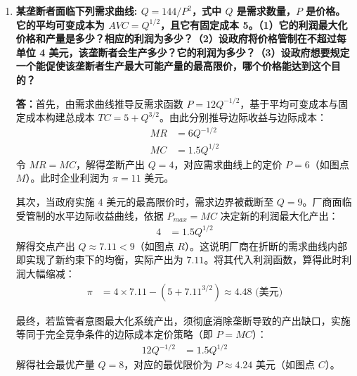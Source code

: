 \begin{enumerate}[label=\textbf{\arabic*.}, leftmargin=*]
		\textbf{答：}这种说法是错误的。垄断定价不仅涉及财富转移，更会导致资源配置的扭曲。当公司制定垄断价格时，必须通过限制产出（即供电量）来维持高价。
		
		对于镇民而言，虽然他们支付的高昂电费最终以利润形式全额返还，实现了资金的内部循环而没有流失，但为了应对高电价，他们被迫减少了原本需要的电力消费。这部分未被生产和消费的电力，其对居民的边际价值实际上高于公司的边际发电成本，这就产生了无谓损失。无谓损失代表了社会总福利的绝对减少，这种由物理产量不足导致的效率折损，是无法通过事后的金钱重新分配来弥补的。
		
		\item \textbf{某垄断者面临下列需求曲线: $Q = 144 / P^2$，式中 $Q$ 是需求数量，$P$ 是价格。它的平均可变成本为 $AVC = Q^{1/2}$，且它有固定成本 5。（1）它的利润最大化价格和产量是多少？相应的利润为多少？（2）设政府将价格管制在不超过每单位 4 美元，该垄断者会生产多少？它的利润为多少？（3）设政府想要规定一个能促使该垄断者生产最大可能产量的最高限价，哪个价格能达到这个目的？}
		
		\textbf{答：}首先，由需求曲线推导反需求函数 $P = 12Q^{-1/2}$，基于平均可变成本与固定成本构建总成本 $TC = 5 + Q^{3/2}$。由此分别推导边际收益与边际成本：
		\[
		\begin{aligned}
			MR &= 6Q^{-1/2} \\
			MC &= 1.5Q^{1/2}
		\end{aligned}
		\]
		令 $MR = MC$，解得垄断产出 $Q = 4$，对应需求曲线上的定价 $P = 6$（如图点 $M$）。此时企业利润为 $\pi = 11$ 美元。
		
		其次，当政府实施 $4$ 美元的最高限价时，需求边界被截断至 $Q = 9$。厂商面临受管制的水平边际收益曲线，依据 $P_{max} = MC$ 决定新的利润最大化产出：
		\[
		\begin{aligned}
			4 &= 1.5Q^{1/2}
		\end{aligned}
		\]
		解得交点产出 $Q \approx 7.11 < 9$（如图点 $R$）。这说明厂商在折断的需求曲线内部即实现了新约束下的均衡，实际产出为 $7.11$。将其代入利润函数，算得此时利润大幅缩减：
		\[
		\begin{aligned}
			\pi &= 4 \times 7.11 - \left( 5 + 7.11^{3/2} \right) \approx 4.48 \text{ (美元)}
		\end{aligned}
		\]
		
		最终，若监管者意图最大化系统产出，须彻底消除垄断导致的产出缺口，实施等同于完全竞争条件的边际成本定价策略（即 $P = MC$）：
		\[
		\begin{aligned}
			12Q^{-1/2} &= 1.5Q^{1/2}
		\end{aligned}
		\]
		解得社会最优产量 $Q = 8$，对应的最优限价为 $P \approx 4.24$ 美元（如图点 $C$）。
		

\end{enumerate}
